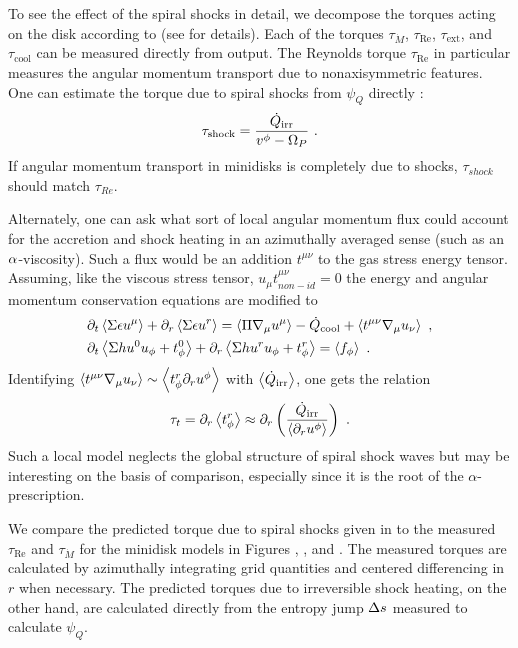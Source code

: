 To see the effect of the spiral shocks in detail, we decompose the torques acting on the disk according to  (see  for details). Each of the torques $\tau_{\dot{M}}$, $\tau_\text{Re}$, $\tau_\text{ext}$, and $\tau_\text{cool}$ can be measured directly from \Disco{} output.  The Reynolds torque $\tau_\text{Re}$ in particular measures the angular momentum transport due to nonaxisymmetric features.  One can estimate the torque due to spiral shocks from $\psi_Q$ directly \citep{Rafikov16}:
\begin{equation}
	\tau_\text{shock} = \frac{\dot{Q}_\text{irr}}{v^\phi - \Om_P} \ . \eqlabel{tauRaf}
\end{equation}
If angular momentum transport in minidisks is completely due to shocks, $\tau_{shock}$ should match $\tau_{Re}$.

Alternately, one can ask what sort of local angular momentum flux could account for the accretion and shock heating in an azimuthally averaged sense (such as an $\alpha$-viscosity).  Such a flux would be an addition $t^{\mu\nu}$ to the gas stress energy tensor.  Assuming, like the viscous stress tensor, $u_\mu t^{\mu\nu}_{non-id} = 0$ the energy and angular momentum conservation equations are modified to
\begin{align}
	&\partial_t \left \langle \Sigma \epsilon u^\mu \right \rangle + \partial_r \left \langle \Sigma \epsilon u^r \right \rangle = \left \langle \Pi \nabla_\mu u^\mu \right \rangle - \dot{Q}_\text{cool} + \left \langle t^{\mu\nu} \nabla_\mu u_\nu \right \rangle \ ,\\
	&\partial_t \left \langle \Sigma h u^0 u_\phi + t^0_\phi \right \rangle + \partial_r \left \langle \Sigma h u^r u_\phi + t^r_\phi \right \rangle = \left \langle f_\phi \right \rangle \ .
\end{align}
Identifying $\left \langle t^{\mu\nu} \nabla_\mu u_\nu \right \rangle \sim \left \langle t^r_\phi \partial_r u^\phi \right \rangle$ with $\left \langle \dot{Q}_\text{irr} \right \rangle$, one gets the relation
\begin{equation}
	\tau_{t} = \partial_r \ave{t^r_\phi} \approx \partial_r \left(\frac{\dot{Q}_\text{irr}}{\ave{\partial_r u^\phi}} \right)\ . \eqlabel{tauLoc}
\end{equation}
Such a local model neglects the global structure of spiral shock waves but may be interesting on the basis of comparison,  especially since it is the root of the $\alpha$-prescription.

We compare the predicted torque due to spiral shocks given in  to the measured $\tau_\text{Re}$ and $\tau_{\dot{M}}$ for the minidisk models in Figures , , and .  The measured torques are calculated by azimuthally integrating grid quantities and centered differencing in $r$ when necessary.  The predicted torques due to irreversible shock heating, on the other hand, are calculated directly from the entropy jump $\Delta s$ measured to calculate $\psi_Q$.  

